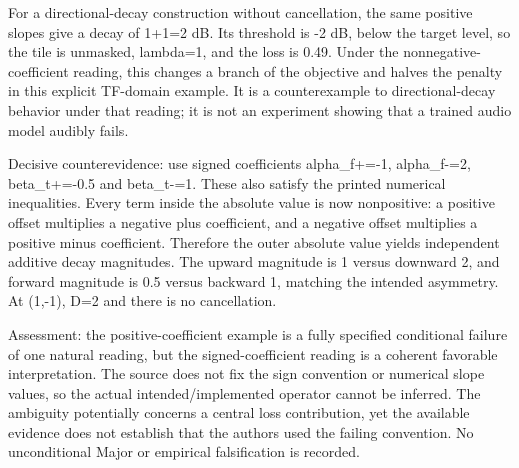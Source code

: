 \documentclass[10pt]{article}
\begin{document}
For a directional-decay construction without cancellation, the same positive slopes give a decay of 1+1=2 dB. Its threshold is -2 dB, below the target level, so the tile is unmasked, lambda=1, and the loss is 0.49. Under the nonnegative-coefficient reading, this changes a branch of the objective and halves the penalty in this explicit TF-domain example. It is a counterexample to directional-decay behavior under that reading; it is not an experiment showing that a trained audio model audibly fails.\par
Decisive counterevidence: use signed coefficients alpha\_f+=-1, alpha\_f-=2, beta\_t+=-0.5 and beta\_t-=1. These also satisfy the printed numerical inequalities. Every term inside the absolute value is now nonpositive: a positive offset multiplies a negative plus coefficient, and a negative offset multiplies a positive minus coefficient. Therefore the outer absolute value yields independent additive decay magnitudes. The upward magnitude is 1 versus downward 2, and forward magnitude is 0.5 versus backward 1, matching the intended asymmetry. At (1,-1), D=2 and there is no cancellation.\par
Assessment: the positive-coefficient example is a fully specified conditional failure of one natural reading, but the signed-coefficient reading is a coherent favorable interpretation. The source does not fix the sign convention or numerical slope values, so the actual intended/implemented operator cannot be inferred. The ambiguity potentially concerns a central loss contribution, yet the available evidence does not establish that the authors used the failing convention. No unconditional Major or empirical falsification is recorded.\par
\end{document}
